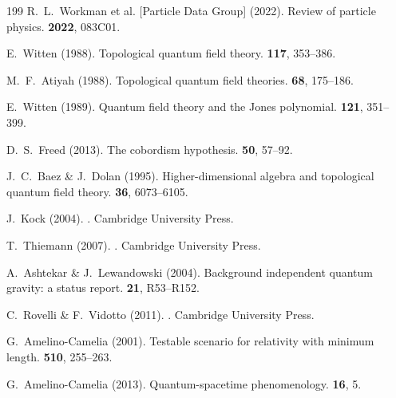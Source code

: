 \documentclass[11pt,a4paper,openright]{book}
\theoremstyle{plain}
\theoremstyle{definition}
\begin{document}
\begin{thebibliography}{199}
R.~L.~Workman et al. [Particle Data Group] (2022).
\newblock Review of particle physics.
 {\bf 2022}, 083C01.


E.~Witten (1988).
\newblock Topological quantum field theory.
 {\bf 117}, 353--386.

M.~F.~Atiyah (1988).
\newblock Topological quantum field theories.
 {\bf 68}, 175--186.

E.~Witten (1989).
\newblock Quantum field theory and the Jones polynomial.
 {\bf 121}, 351--399.

D.~S.~Freed (2013).
\newblock The cobordism hypothesis.
 {\bf 50}, 57--92.

J.~C.~Baez \& J.~Dolan (1995).
\newblock Higher-dimensional algebra and topological quantum field theory.
 {\bf 36}, 6073--6105.

J.~Kock (2004).
.
\newblock Cambridge University Press.


T.~Thiemann (2007).
.
\newblock Cambridge University Press.

A.~Ashtekar \& J.~Lewandowski (2004).
\newblock Background independent quantum gravity: a status report.
 {\bf 21}, R53--R152.

C.~Rovelli \& F.~Vidotto (2011).
.
\newblock Cambridge University Press.

G.~Amelino-Camelia (2001).
\newblock Testable scenario for relativity with minimum length.
 {\bf 510}, 255--263.

G.~Amelino-Camelia (2013).
\newblock Quantum-spacetime phenomenology.
 {\bf 16}, 5.


\end{thebibliography}
\end{document}
